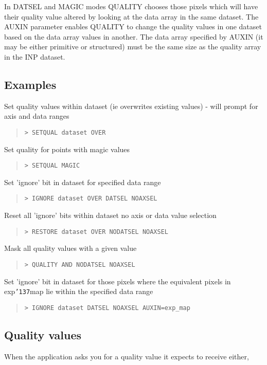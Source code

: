 \documentclass{book}
\renewcommand{\_}{{\tt\char'137}}     %
\begin{document}
In DATSEL and MAGIC modes QUALITY chooses those pixels which will
have their quality value altered by looking at the data array in
the same dataset. The AUXIN parameter enables QUALITY to change
the quality values in one dataset based on the data array values
in another. The data array specified by AUXIN (it may be either
primitive or structured) must be the same size as the quality
array in the INP dataset.
 
\subsection{Examples}
Set quality values within dataset (ie overwrites existing values) -
will prompt for axis and data ranges
\begin{quote}\begin{verbatim}
> SETQUAL dataset OVER
\end{verbatim}\end{quote}
Set quality for points with magic values
\begin{quote}\begin{verbatim}
> SETQUAL MAGIC
\end{verbatim}\end{quote}
Set 'ignore' bit in dataset for specified data range
\begin{quote}\begin{verbatim}
> IGNORE dataset OVER DATSEL NOAXSEL
\end{verbatim}\end{quote}
Reset all 'ignore' bits within dataset no axis or data value selection
\begin{quote}\begin{verbatim}
> RESTORE dataset OVER NODATSEL NOAXSEL
\end{verbatim}\end{quote}
Mask all quality values with a given value
\begin{quote}\begin{verbatim}
> QUALITY AND NODATSEL NOAXSEL
\end{verbatim}\end{quote}
Set 'ignore' bit in dataset for those pixels where the equivalent
pixels in exp\_map lie within the specified data range
\begin{quote}\begin{verbatim}
> IGNORE dataset DATSEL NOAXSEL AUXIN=exp_map
\end{verbatim}\end{quote}
\subsection{Quality values}
When the application asks you for a quality value it expects to
receive either,
 
\end{document}
